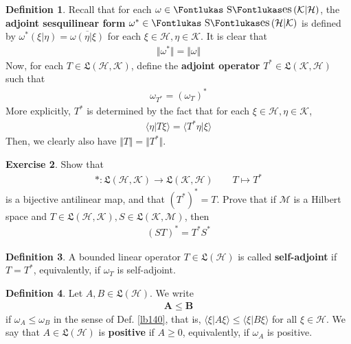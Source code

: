 \documentclass[12pt,b5paper,notitlepage]{article}
\theoremstyle{definition}
\newtheorem{df}{Definition}[section]
\newtheorem{exe}[df]{Exercise}
\theoremstyle{plain}
\DeclareMathOperator{\Ses}{\text{\Fontlukas S}\text{\kern -0pt {\Fontlukas\large es}}\,}
\newcommand{\fk}{\mathfrak}
\newcommand{\ovl}{\overline}
\newcommand{\bk}[1]{\langle {#1}\rangle}
\newcommand{\MH}{\mathcal H}
\newcommand{\MK}{\mathcal K}
\newcommand{\MM}{\mathcal M}
\numberwithin{equation}{section}
\begin{document}
\begin{df}
Recall that for each $\omega\in\Ses(\MK|\MH)$, the \textbf{adjoint sesquilinear form} $\omega^*\in\Ses(\MH|\MK)$ is defined by $\omega^*(\xi|\eta)=\ovl{\omega(\eta|\xi)}$ for each $\xi\in\MH,\eta\in\MK$. It is clear that
\begin{align*}
\Vert\omega^*\Vert=\Vert\omega\Vert
\end{align*}
Now, for each $T\in\fk L(\MH,\MK)$, define the \textbf{adjoint operator}  $T^*\in\fk L(\MK,\MH)$ such that
\begin{align*}
\omega_{T^*}=(\omega_T)^*
\end{align*}
More explicitly, $T^*$ is determined by the fact that for each $\xi\in\MH,\eta\in\MK$,
\begin{align*}
\bk{\eta|T\xi}=\bk{T^*\eta|\xi}
\end{align*}
Then, we clearly also have $\Vert T\Vert=\Vert T^*\Vert$.
\end{df}



\begin{exe}
Show that
\begin{align*}
*:\fk L(\MH,\MK)\rightarrow\fk L(\MK,\MH)\qquad T\mapsto T^*
\end{align*}
is a bijective antilinear map, and that $(T^*)^*=T$. Prove that if $\MM$ is a Hilbert space and $T\in\fk L(\MH,\MK),S\in\fk L(\MK,\MM)$, then
\begin{align*}
(ST)^*=T^*S^*
\end{align*}
\end{exe}


\begin{df}
A bounded linear operator $T\in\fk L(\MH)$ is called \textbf{self-adjoint}  if $T=T^*$, equivalently, if $\omega_T$ is self-adjoint.
\end{df}


\begin{df}
Let $A,B\in\fk L(\MH)$. We write
\begin{align*}
\pmb{A\leq B}
\end{align*}
if $\omega_A\leq\omega_B$ in the sense of Def. \ref{lb140}, that is, $\bk{\xi|A\xi}\leq\bk{\xi|B\xi}$ for all $\xi\in\MH$. We say that $A\in\fk L(\MH)$ is \textbf{positive}  if $A\geq0$, equivalently, if $\omega_A$ is positive. 
\end{df}
\end{document}
